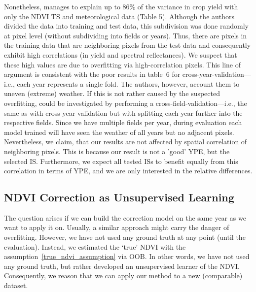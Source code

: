 {{        Nonetheless, \cite{perichPixelbasedCropYield2022} manages to explain up to 86\% of the variance in crop yield with only the NDVI TS and meteorological data (Table 5).  Although the authors divided the data into training and test data, this subdivision was done randomly at pixel level (without subdividing into fields or years). Thus, there are pixels in the training data that are neighboring pixels from the test data and consequently exhibit high correlations (in yield and spectral reflectances). We suspect that these high values are due to overfitting via high-correlation pixels. This line of argument is consistent with the poor results in table~6 for cross-year-validation---i.e., each year represents a single fold. The authors, however, account them to uneven (extreme) weather.  If this is not rather caused by the suspected overfitting, could be investigated by performing a cross-field-validation---i.e., the same as with cross-year-validation but with splitting each year further into the respective fields. Since we have multiple fields per year, during evaluation each model trained will have seen the weather of all years but no adjacent pixels.%
        Nevertheless, we claim, that our results are not affected by spatial correlation of neighboring pixels. This is because our result is not a 'good' YPE, but the selected IS. Furthermore, we expect all tested ISs to benefit equally from this correlation in terms of YPE, and we are only interested in the relative differences.  
    }

    \subsection{NDVI Correction as Unsupervised Learning}
        The question arises if we can build the correction model on the same year as we want to apply it on. Usually, a similar approach might carry the danger of overfitting. However, we have not used any ground truth at any point (until the evaluation). Instead, we estimated the `true' NDVI with the assumption~\ref{true_ndvi_assumption} via OOB. In other words, we have not used any ground truth, but rather developed an unsupervised learner of the NDVI. Consequently, we reason that we can apply our method to a new (comparable) dataset.
}
